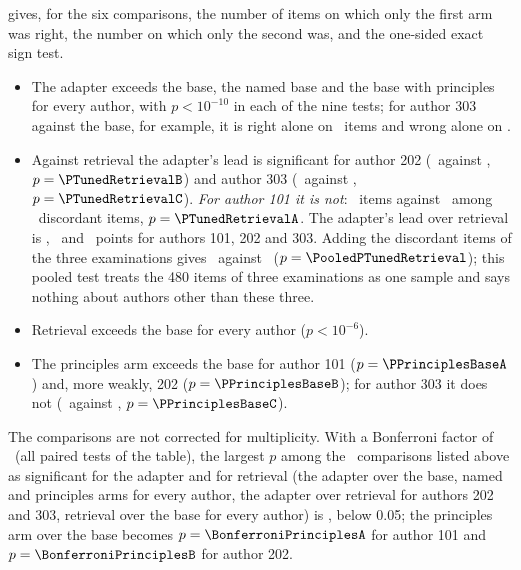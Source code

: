 gives, for the six comparisons, the number of items on which only the first
arm was right, the number on which only the second was, and the one-sided exact sign test.
\begin{itemize}
\item The adapter exceeds the base, the named base and the base with principles for every
  author, with $p<10^{-10}$ in each of the nine tests; for author 303 against the base,
  for example, it is right alone on \OnlyFirstTunedBaseC\ items and wrong alone on
  \OnlySecondTunedBaseC.
\item Against retrieval the adapter's lead is significant for author 202 (\OnlyFirstTunedRetrievalB\ against
  \OnlySecondTunedRetrievalB, $p=\PTunedRetrievalB$) and author 303 (\OnlyFirstTunedRetrievalC\ against
  \OnlySecondTunedRetrievalC, $p=\PTunedRetrievalC$). \emph{For author 101 it is not}: \OnlyFirstTunedRetrievalA\ items
  against \OnlySecondTunedRetrievalA\ among \DiscTunedRetrievalA\ discordant items, $p=\PTunedRetrievalA$.
  The adapter's lead over retrieval is \LeadPtsTunedRetrievalA, \LeadPtsTunedRetrievalB\ and
  \LeadPtsTunedRetrievalC\ points for authors 101, 202 and 303. Adding the discordant items of the
  three examinations gives \PooledFirstTunedRetrieval\ against \PooledSecondTunedRetrieval\
  ($p=\PooledPTunedRetrieval$); this pooled test treats the 480 items of three examinations as one
  sample and says nothing about authors other than these three.
\item Retrieval exceeds the base for every author ($p<10^{-6}$).
\item The principles arm exceeds the base for author 101 ($p=\PPrinciplesBaseA$) and, more weakly, 202 ($p=\PPrinciplesBaseB$);
  for author 303 it does not (\OnlyFirstPrinciplesBaseC\ against \OnlySecondPrinciplesBaseC,
  $p=\PPrinciplesBaseC$).
\end{itemize}
The comparisons are not corrected for multiplicity. With a Bonferroni factor of \PairedTests\
(all paired tests of the table), the largest $p$ among the \ClaimedTests\ comparisons
listed above as significant for the adapter and for retrieval (the adapter over the base, named
and principles arms for every author, the adapter over retrieval for authors 202 and 303,
retrieval over the base for every author) is \BonferroniClaimedMax, below 0.05; the principles
arm over the base becomes $p=\BonferroniPrinciplesA$ for author 101 and $p=\BonferroniPrinciplesB$
for author 202.

\begin{table}[t]
\centering\footnotesize
\resizebox{\textwidth}{!}{}
\caption{Paired comparisons on the same \ExamItems\ items. ``first--second'' is the number of items
only the first arm answered right and the number only the second did; $p$ is the exact one-sided sign test
of the first arm being better. Pooled columns add the counts of the three authors.}
\label{tab:paired}
\end{table}

